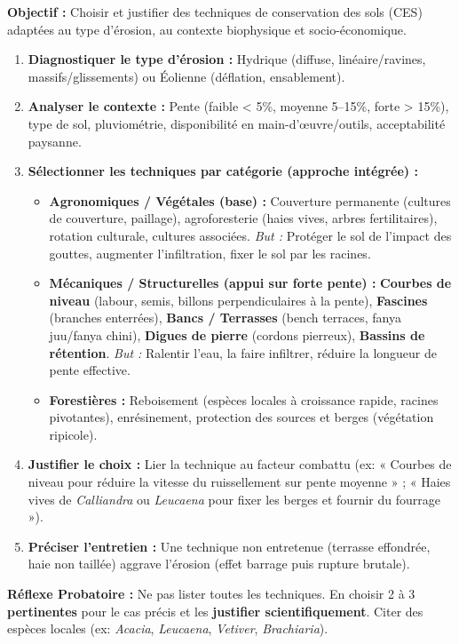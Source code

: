 \documentclass[11pt]{article}
\begin{document}
\begin{methode}
    \textbf{Objectif :} Choisir et justifier des techniques de conservation des sols (CES) adaptées au type d'érosion, au contexte biophysique et socio-économique.
    \begin{enumerate}
        \item \textbf{Diagnostiquer le type d'érosion :} Hydrique (diffuse, linéaire/ravines, massifs/glissements) ou Éolienne (déflation, ensablement).
        \item \textbf{Analyser le contexte :} Pente (faible < 5\%, moyenne 5–15\%, forte > 15\%), type de sol, pluviométrie, disponibilité en main-d'œuvre/outils, acceptabilité paysanne.
        \item \textbf{Sélectionner les techniques par catégorie (approche intégrée) :}
        \begin{itemize}
            \item \textbf{Agronomiques / Végétales (base) :} Couverture permanente (cultures de couverture, paillage), agroforesterie (haies vives, arbres fertilitaires), rotation culturale, cultures associées. \emph{But :} Protéger le sol de l'impact des gouttes, augmenter l'infiltration, fixer le sol par les racines.
            \item \textbf{Mécaniques / Structurelles (appui sur forte pente) :} \textbf{Courbes de niveau} (labour, semis, billons perpendiculaires à la pente), \textbf{Fascines} (branches enterrées), \textbf{Bancs / Terrasses} (bench terraces, fanya juu/fanya chini), \textbf{Digues de pierre} (cordons pierreux), \textbf{Bassins de rétention}. \emph{But :} Ralentir l'eau, la faire infiltrer, réduire la longueur de pente effective.
            \item \textbf{Forestières :} Reboisement (espèces locales à croissance rapide, racines pivotantes), enrésinement, protection des sources et berges (végétation ripicole).
        \end{itemize}
        \item \textbf{Justifier le choix :} Lier la technique au facteur combattu (ex: « Courbes de niveau pour réduire la vitesse du ruissellement sur pente moyenne » ; « Haies vives de \emph{Calliandra} ou \emph{Leucaena} pour fixer les berges et fournir du fourrage »).
        \item \textbf{Préciser l'entretien :} Une technique non entretenue (terrasse effondrée, haie non taillée) aggrave l'érosion (effet barrage puis rupture brutale).
    \end{enumerate}
    \textbf{Réflexe Probatoire :} Ne pas lister toutes les techniques. En choisir 2 à 3 \textbf{pertinentes} pour le cas précis et les \textbf{justifier scientifiquement}. Citer des espèces locales (ex: \emph{Acacia}, \emph{Leucaena}, \emph{Vetiver}, \emph{Brachiaria}).
\end{methode}
\end{document}
